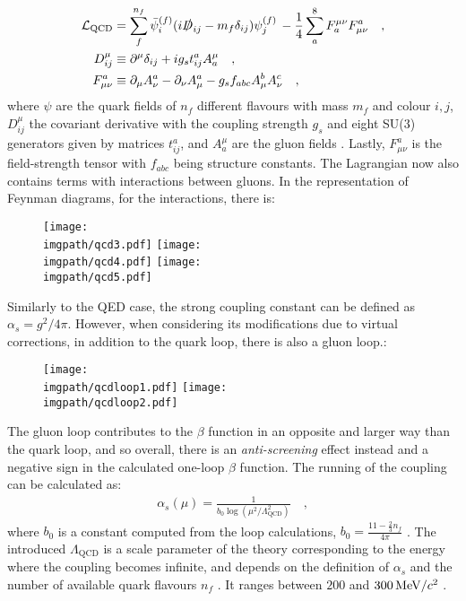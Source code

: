 \begin{align}\label{eq:intro:lqcd}
\mathcal{L}_\mathrm{QCD} &= \sum_{f}^{n_f} \bar{\psi}_i^{(f)}(i \slashed D_{ij}-m_f \delta_{ij} ) \psi_j^{(f)} \, - \frac{1}{4} \sum_a^8 F^{\mu\nu}_a F_{\mu\nu}^a \quad , \\
D^\mu_{ij} &\equiv \partial^\mu \delta_{ij} + i g_s t^a_{ij}A^\mu_a \quad , \\
F^a_{\mu\nu} &\equiv \partial_\mu A^a_\nu - \partial_\nu A^a_\mu - g_s f_{abc} A^b_\mu A^c_\nu \quad ,
\end{align}
where $\psi$ are the quark fields of $n_f$ different flavours with mass $m_f$ and colour $i,j$, $D^\mu_{ij}$ the covariant derivative with the coupling strength $g_s$ and eight SU($3$) generators given by matrices $t^a_{ij}$, and $A_a^{\mu}$ are the gluon fields \cite{altarelliQCDPrimer2002}. Lastly, $F^a_{\mu\nu}$ is the field-strength tensor with $f_{abc}$ being structure constants. The Lagrangian now also contains terms with interactions between gluons. In the representation of Feynman diagrams, for the interactions, there is:
\begin{figure}[H]
\texttt{[image: \\imgpath/qcd3.pdf]}\hspace{1em}
\texttt{[image: \\imgpath/qcd4.pdf]}\hspace{1em}
\texttt{[image: \\imgpath/qcd5.pdf]}
\end{figure}

Similarly to the QED case, the strong coupling constant can be defined as $\alpha_s = g^2/4\pi$. However, when considering its modifications due to virtual corrections, in addition to the quark loop, there is also a gluon loop.:
\begin{figure}[H]
\texttt{[image: \\imgpath/qcdloop1.pdf]}\hspace{2em}
\texttt{[image: \\imgpath/qcdloop2.pdf]}
\end{figure}

The gluon loop contributes to the $\beta$ function in an opposite and larger way than the quark loop, and so overall, there is an \textit{anti-screening} effect instead and a negative sign in the calculated one-loop $\beta$ function. The running of the coupling can be calculated as:
\begin{align}
\alpha_s (\mu) = \frac{1}{b_0 \log ( \mu^2 / \Lambda_\mathrm{QCD}^2 )} \quad ,
\end{align} 
where $b_0$ is a constant computed from the loop calculations, $b_0 = \frac{11-\frac{2}{3}n_f}{4\pi}$ \cite{politzerReliablePerturbativeResults1973}. The introduced $\Lambda_\mathrm{QCD}$ is a scale parameter of the theory corresponding to the energy where the coupling becomes infinite, and depends on the definition of $\alpha_s$ and the number of available quark flavours $n_f$ \cite{altarelliQCDPrimer2002}. It ranges between $200$ and $300 \text{\,MeV/$c^2$}$ \cite{deurQCDRunningCoupling2016}.

